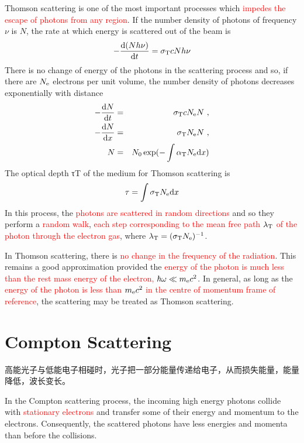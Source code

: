 \documentclass[12pt,a4paper]{article}
\newcommand{\dif}{\mathrm{d}}
\begin{document}
Thomson scattering is one of the most important processes which \textcolor{red}{impedes the escape of photons from any region}. If the number density of photons of frequency $\nu$ is $N$, the rate at which energy is scattered out of the beam is
\begin{equation}
-\frac{\dif (N h\nu)}{\dif t} = \sigma_{\rm T} c N h \nu
\end{equation}
There is no change of energy of the photons in the scattering process and so, if there are $N_{\rm e}$ electrons per unit volume, the number density of photons decreases exponentially with distance
\begin{eqnarray}
-\frac{\dif N}{\dif t} &=& \sigma_{\rm T} c N_{\rm e} N ~, \\
-\frac{\dif N}{\dif x} &=& \sigma_{\rm T} N_{\rm e} N ~, \\
N &=& N_0 \exp (-\int \alpha_{\rm T} N_{\rm e} \dif x)
\end{eqnarray}
The optical depth τT of the medium for Thomson scattering is
\begin{equation}
\tau = \int \sigma_{\rm T} N_{\rm e} \dif x
\end{equation}
In this process, the \textcolor{red}{photons are scattered in random directions} and so they perform a \textcolor{red}{random walk}, \textcolor{red}{each step corresponding to the mean free path $\lambda_{\rm T}$ of the photon through the electron gas}, where \textcolor{red}{$\lambda_{\rm T} = (\sigma_{\rm T}N_{\rm e})^{-1}$}. 

In Thomson scattering, there is \textcolor{red}{no change in the frequency of the radiation}. This remains a good approximation provided the \textcolor{red}{energy of the photon is much less than the rest mass energy of the electron, $\hbar \omega \ll m_{\rm e} c^2$}. In general, as long as the \textcolor{red}{energy of the photon is less than $m_{\rm e} c^2$ in the centre of momentum frame of reference}, the scattering may be treated as Thomson scattering.

\section{Compton Scattering}
高能光子与低能电子相碰时，光子把一部分能量传递给电子，从而损失能量，能量降低，波长变长。

In the Compton scattering process, the incoming high energy photons collide with \textcolor{red}{stationary electrons} and transfer some of their energy and momentum to the electrons. Consequently, the scattered photons have less energies and momenta than before the collisions.
\end{document}
